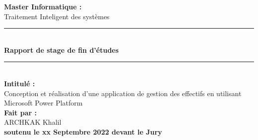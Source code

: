 \documentclass[11pt,french]{report}
\begin{document}

\begin{titlepage}

\begin{center}

\par
{}
\hfill{}
\par
\vspace*{1.3cm}

\linespread{1.3}\huge {\bfseries Master Informatique :}\\\Huge{Traitement Inteligent des systèmes}

\rule{\textwidth}{2pt}\\[0.3cm]
\huge{\bfseries Rapport de stage de fin d'études}
\rule{\textwidth}{2pt}\\[0.3cm]

\linespread{1.5}\huge {\bfseries Intitulé :}\\
Conception et réalisation d'une application de gestion des effectifs en utilisant Microsoft Power Platform \\[0,3cm]

\linespread{1.3}\huge {\bfseries Fait par :}\\{\huge ARCHKAK Khalil}\\[0.5cm]

\noindent \Large{\textbf{soutenu le xx Septembre 2022 devant le Jury}} \\[0.7cm]



\end{center}
\end{titlepage}
\end{document}
